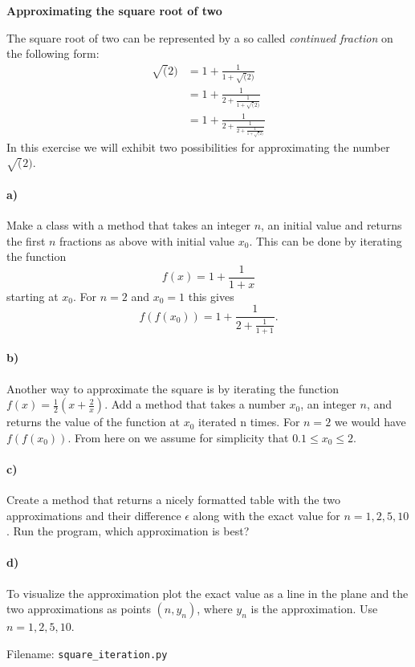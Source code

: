 \newpage
\begin{Problem}{\textbf{Approximating the square root of two}} \label{prob72}

\noindent The square root of two can be represented by a so called \emph{continued fraction}
on the following form:
\begin{align*}
\sqrt(2)&= 1 + \frac{1}{1+\sqrt(2)} \\
        &= 1 + \frac{1}{2+\frac{1}{1+\sqrt(2)}} \\
        &= 1 + \frac{1}{2+\frac{1}{2+\frac{1}{1+\sqrt(2)}}}
\end{align*}
In this exercise we will exhibit two possibilities for approximating the number
$\sqrt(2)$.

\paragraph{a)}
Make a class  with a method  that takes an integer $n$,
an initial value and returns the first $n$ fractions as above with initial value $x_0$. This can be done by iterating the
function
\begin{equation*}
    f(x) = 1+\frac{1}{1+x}
\end{equation*}
starting at $x_0$. For $n=2$ and $x_0=1$ this gives
\begin{equation*}
f(f(x_0)) = 1 + \frac{1}{2+\frac{1}{1+1}}.
\end{equation*}

\paragraph{b)}
Another way to approximate the square is by iterating the function $f(x)=\frac{1}{2}\left(x+\frac{2}{x}\right)$.
Add a method  that takes
a number $x_0$, an integer $n$, and 
returns the value of the function at $x_0$ iterated n times. For $n=2$ we would have
$f(f(x_0))$. From here on we assume for simplicity that $0.1 \leq x_0 \leq 2$.

\paragraph{c)}
Create a method that returns a nicely formatted table with
the two approximations and their difference $\epsilon$ along with the exact value for $n=1,2,5,10$.
Run the program, which approximation is best?

\paragraph{d)}
To visualize the approximation plot the exact value as a line in the plane
and the two approximations as points $(n, y_n)$, where $y_n$ is the approximation. Use $n = 1,2,5,10$.

Filename: \texttt{square\_iteration.py}
\end{Problem}

